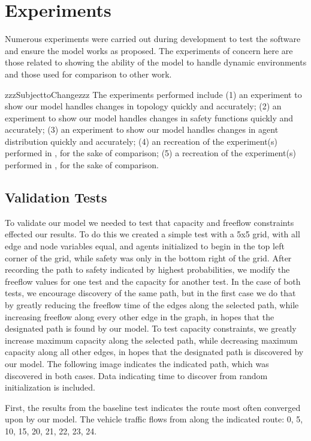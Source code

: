 \section{Experiments}
Numerous experiments were carried out during development to test the software and ensure the model works as proposed. The experiments of concern here are those related to showing the ability of the model to handle dynamic environments and those used for comparison to other work.


zzzSubjecttoChangezzz
The experiments performed include (1) an experiment to show our model handles changes in topology quickly and accurately; (2) an experiment to show our model handles changes in safety functions quickly and accurately; (3) an experiment to show our model handles changes in agent distribution quickly and accurately; (4) an recreation of the experiment(s) performed in \cite{lu2004capacity}, for the sake of comparison; (5) a recreation of the experiment(s) performed in \cite{bazzan2014evolutionary}, for the sake of comparison.
\subsection{Validation Tests}
To validate our model we needed to test that capacity and freeflow constraints effected our results. To do this we created a simple test with a 5x5 grid, with all edge and node variables equal, and agents initialized to begin in the top left corner of the grid, while safety was only in the bottom right of the grid. After recording the path to safety indicated by highest probabilities, we modify the freeflow values for one test and the capacity for another test. In the case of both tests, we encourage discovery of the same path, but in the first case we do that by greatly reducing the freeflow time of the edges along the selected path, while increasing freeflow along every other edge in the graph, in hopes that the designated path is found by our model. To test capacity constraints, we greatly increase maximum capacity along the selected path, while decreasing maximum capacity along all other edges, in hopes that the designated path is discovered by our model. The following image indicates the indicated path, which was discovered in both cases. Data indicating time to discover from random initialization is included.

First, the results from the baseline test indicates the route most often converged upon by our model. The vehicle traffic flows from along the indicated route: 0, 5, 10, 15, 20, 21, 22, 23, 24.

